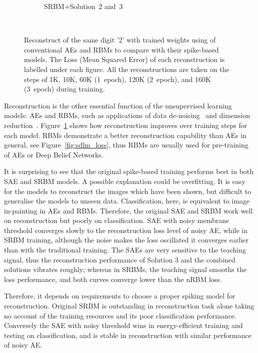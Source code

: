 \begin{figure}
\begin{subfigure}[t]{0.32\textwidth}
		\caption{SRBM+Solution~2 and~3}
	\end{subfigure}\\
	\caption{Reconstruct of the same digit '2' with trained weights using of conventional AEs and RBMs to compare with their spike-based models.
		The Loss (Mean Squared Error) of each reconstruction is labelled under each figure.
		All the reconstructions are taken on the steps of 1K, 10K, 60K (1~epoch), 120K (2~epoch), and 160K (3~epoch) during training.}
	\label{fig:sdlm_recon}
\end{figure}

Reconstruction is the other essential function of the unsupervised learning models: AEs and RBMs, such as applications of data de-noising~\cite{xie2012image} and dimension reduction~\cite{hinton2006fast}.
Figure~\ref{fig:sdlm_recon} shows how reconstruction improves over training steps for each model.
RBMs demonstrate a better reconstruction capability than AEs in general, see Figure~\ref{fig:sdlm_loss}, thus RBMs are usually used for pre-training of AEs or Deep Belief Networks.

It is surprising to see that the original spike-based training performs best in both SAE and SRBM models.
A possible explanation could be overfitting.
It is easy for the models to reconstruct the images which have been shown, but difficult to generalise the models to unseen data.
Classification, here, is equivalent to image in-painting in AEs and RBMs.
Therefore, the original SAE and SRBM work well on reconstruction but poorly on classification.
SAE with noisy membrane threshold converges slowly to the reconstruction loss level of noisy AE, while in SRBM training, although the noise makes the loss oscillated it converges earlier than with the traditional training.
The SAEs are very sensitive to the teaching signal, thus the reconstruction performance of Solution 3 and the combined solutions vibrates roughly; 
whereas in SRBMs, the teaching signal smooths the loss performance, and both curves converge lower than the nRBM loss.

Therefore, it depends on requirements to choose a proper spiking model for reconstruction.
Original SRBM is outstanding in reconstruction task alone taking no account of the training resources and its poor classification performance.
Conversely the SAE with noisy threshold wins in energy-efficient training and testing on classification, and is stable in reconstruction with similar performance of noisy AE.


